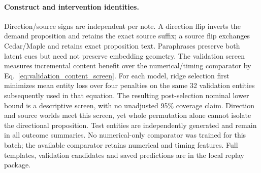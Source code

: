 \paragraph{Construct and intervention identities.}
Direction/source signs are independent per note. A direction flip inverts the demand proposition and retains the exact source suffix; a source flip exchanges Cedar/Maple and retains exact proposition text. Paraphrases preserve both latent cues but need not preserve embedding geometry. The validation screen measures incremental content benefit over the numerical/timing comparator by Eq.~\ref{eq:validation_content_screen}. For each model, ridge selection first minimizes mean entity loss over four penalties on the same 32 validation entities subsequently used in that equation. The resulting post-selection nominal lower bound is a descriptive screen, with no unadjusted 95\% coverage claim. Direction and source worlds meet this screen, yet whole permutation alone cannot isolate the directional proposition. Test entities are independently generated and remain in all outcome summaries. No numerical-only comparator was trained for this batch; the available comparator retains numerical and timing features. Full templates, validation candidates and saved predictions are in the local replay package.

